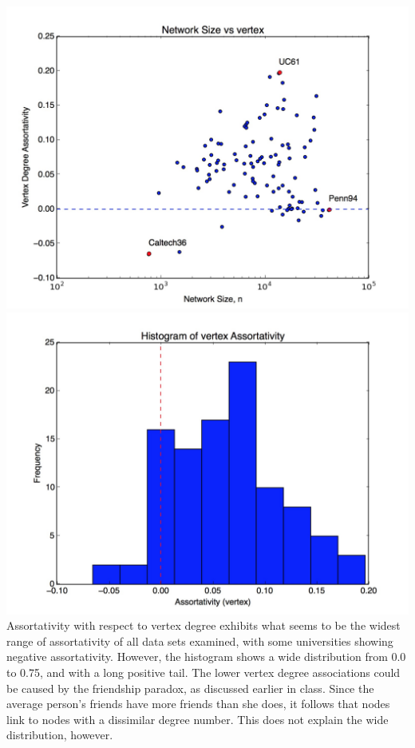 \documentclass[11pt, oneside]{article}   	%
\begin{document}
\includegraphics[scale=.15]{vertex.jpg}\includegraphics[scale=.15]{vertexHist.jpg}\\
\indent Assortativity with respect to vertex degree exhibits what seems to be the widest range of assortativity of all data sets examined, with some universities showing negative assortativity.  However, the histogram shows a wide distribution from 0.0 to 0.75, and with a long positive tail.  The lower vertex degree associations could be caused by the friendship paradox, as discussed earlier in class.  Since the average person's friends have more friends than she does, it follows that nodes link to nodes with a dissimilar degree number.  This does not explain the wide distribution, however.\\\\\\
\end{document}
